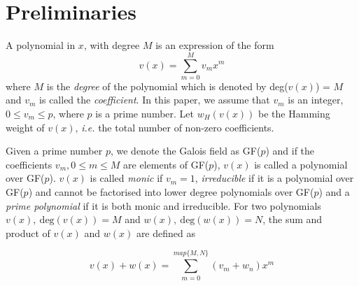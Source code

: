 \section{Preliminaries}
\label{secPrelim}

A polynomial in $x$, with degree $M$ is an expression of the form
\begin{equation*}
v(x) = \sum_{m=0}^{M} v_mx^m
\end{equation*}
where $M$ is the \textit{degree} of the polynomial which is denoted by deg($v(x)$) = $M$ and $v_m$ is called the \textit{coefficient}. In this paper, we assume that $v_m$ is an integer, $0 \leq v_m \leq p$, where $p$ is a prime number. 
 Let $w_H(v(x))$ be the Hamming weight of $v(x)$, \textit{i.e.} the total number of non-zero coefficients.

Given a prime number $p$, we denote the Galois field as GF($p$) and if the coefficients $v_m, 0 \leq m \leq M$ are elements of GF($p$), $v(x)$ is called a polynomial over GF($p$). $v(x)$ is called \textit{monic} if $v_m=1$, \textit{irreducible} if it is a polynomial over GF($p$) and cannot be factorised into lower degree polynomials over GF($p$) and a \textit{prime polynomial} if it is both monic and irreducible. 
For two polynomials $v(x),~\text{deg}(v(x))=M$ and $w(x),~\text{deg}(w(x))=N$, the sum and product of $v(x)$ and $w(x)$ are defined as 

\begin{equation*}
v(x)+w(x)=\sum_{m=0}^{map\{ M,N\}} (v_m +w_n)x^m
\end{equation*}

